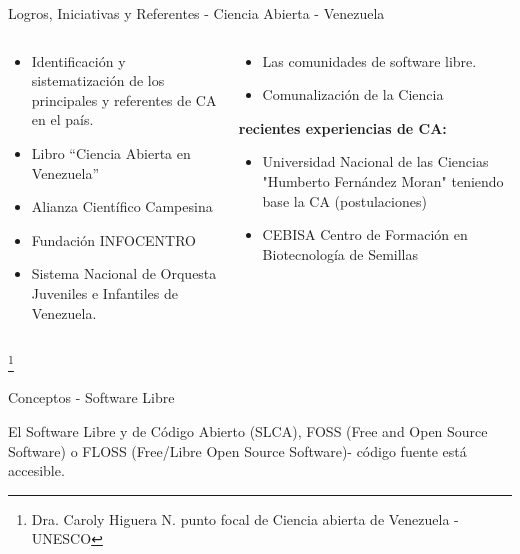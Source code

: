 \documentclass[11pt]{beamer}
\begin{document}
	\begin{frame}{Logros, Iniciativas y Referentes - Ciencia Abierta - Venezuela}
	\begin{columns} %
			\begin{column}{0.5\textwidth}
				\begin{itemize}
				\item Identificación y sistematización de los principales y referentes de CA en el país.
				\item Libro “Ciencia Abierta en Venezuela”
				\item Alianza Científico Campesina 
				\item Fundación INFOCENTRO
				\item Sistema Nacional de Orquesta Juveniles e Infantiles de Venezuela.
				\end{itemize}           		
        		\end{column}
        		\begin{column}{0.5\textwidth}
            		\begin{itemize}
            		\item Las comunidades de software libre.
            		\item Comunalización de la Ciencia
            		\end{itemize}
            		\textbf{recientes experiencias de CA:}
            		\begin{itemize}
            		\item Universidad Nacional de las Ciencias "Humberto Fernández Moran" teniendo base la CA (postulaciones)
            		\item CEBISA Centro de Formación en Biotecnología de Semillas
            		\end{itemize}
        		\end{column}
    		\end{columns} %
    		\footnote{Dra. Caroly Higuera N. punto focal de Ciencia abierta de Venezuela -UNESCO} 
	\end{frame}
	

	\begin{frame}{Conceptos - Software Libre}

  		El Software Libre y de Código Abierto (SLCA), FOSS (Free and Open Source Software) o FLOSS (Free/Libre Open Source Software)- código fuente está accesible.
 	
	\end{frame}
	
\end{document}
